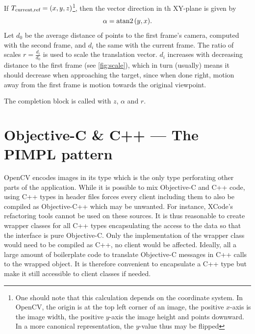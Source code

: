 If $T_{\text{current,ref}} = (x,y,z)$\footnote{One should note that this
   calculation depends on the coordinate system. In OpenCV, the origin is at the
   top left corner of an image, the positive $x$-axis is the image width, the
   positive $y$-axis the image height and points downward. In a more canonical
representation, the $y$-value thus may be flipped}, then the vector direction
in th XY-plane is given by 
\begin{equation*}
   \alpha = \atan2{(y,x)}.
\end{equation*}
Let $d_0$ be the average distance of points to the first frame's camera,
computed with the second frame, and $d_i$ the same with the current frame. The
ratio of scales $r=\frac{d_i}{d_0}$ is used to scale the translation vector. $d_i$
increases with decreasing distance to the first frame (see \autoref{fig:scale}),
which in turn (usually) means it should decrease when approaching the target,
since when done right, motion away from the first frame is motion towards the
original viewpoint.

The completion block is called with $z$, $\alpha$ and $r$.

\section{Objective-C \& C++ --- The PIMPL pattern}

 OpenCV encodes images in its  type which is
the only type perforating other parts of the application.  While it is possible
to mix Objective-C and C++ code, using C++ types in header files forces every
client including them to also be compiled as Objective-C++ which may be
unwanted. For instance, XCode's refactoring tools cannot be used on these
sources. It is thus reasonable to create wrapper classes for all C++ types
encapsulating the access to the data so that the interface is pure Objective-C.
Only the implementation of the wrapper class would need to be compiled as C++,
no client would be affected. Ideally, all a large amount of boilerplate code to
translate Objective-C messages in C++ calls to the wrapped object.  It is
therefore convenient to encapsulate a C++ type but make it still accessible to
client classes if needed. 

